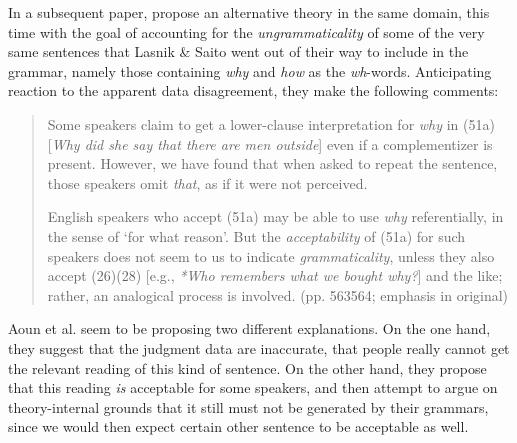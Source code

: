 In a subsequent paper, \citet{AounEtAl1987} propose an alternative theory in the same domain, this time with the goal of accounting for the \textit{ungrammaticality} of some of the very same sentences that Lasnik \& Saito went out of their way to include in the grammar, namely those containing \textit{why} and \textit{how} as the \textit{wh}-words. Anticipating reaction to the apparent data disagreement, they make the following comments:

\begin{quote}
Some speakers claim to get a lower-clause interpretation for \textit{why} in (51a) [\textit{Why did she say that there are men outside}] even if a complementizer is present. However, we have found that when asked to repeat the sentence, those speakers omit \textit{that}, as if it were not perceived.


English speakers who accept (51a) may be able to use \textit{why} referentially, in the sense of `for what reason'. But the \textit{acceptability} of (51a) for such speakers does not seem to us to indicate \textit{grammaticality}, unless they also accept (26)\textendash{}(28) [e.g., \textit{*Who remembers what we bought why?}] and the like; rather, an analogical process is involved. (pp. 563\textendash{}564; emphasis in original)
\end{quote}

\noindent
Aoun et al. seem to be proposing  two different explanations. On the one hand, they suggest that the judgment data are inaccurate, that people really cannot get the relevant reading of this kind of sentence. On the other hand, they propose that this reading \textit{is} acceptable for some speakers, and then attempt to argue on theory-internal grounds that it still must not be generated by their grammars, since we would then expect certain other sentence to be acceptable as well.

